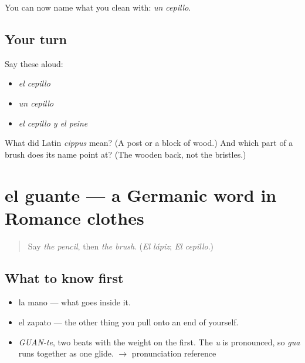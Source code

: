 \begin{grammarlens}[title={What you've built}]
You can now name what you clean with: \emph{un cepillo}.
\end{grammarlens}

\subsection*{Your turn}
Say these aloud:

\begin{itemize}
\raggedright
  \item \emph{el cepillo}
  \item \emph{un cepillo}
  \item \emph{el cepillo y el peine}
\end{itemize}

\begin{tcolorbox}[breakable,colback=teal!4,colframe=teal!35!black,title={Before you move on}]
What did Latin \emph{cippus} mean? (A post or a block of wood.) And which part of a brush does its name point at? (The wooden back, not the bristles.)
\end{tcolorbox}
\section[el guante]{el guante — a Germanic word in Romance clothes}

\label{lesson:ES-C374-guante}



\begin{quote}
Say \emph{the pencil}, then \emph{the brush}. (\emph{El lápiz}; \emph{El cepillo}.)
\end{quote}

\subsection*{What to know first}
\begin{itemize}
\raggedright
  \item la mano — what goes inside it.
  \item el zapato — the other thing you pull onto an end of yourself.
\end{itemize}

\begin{sounds}
\begin{itemize}
\raggedright
  \item \emph{GUAN-te}, two beats with the weight on the first. The \emph{u} is pronounced, so \emph{gua} runs together as one glide. $\to$ pronunciation reference
\end{itemize}
\end{sounds}

